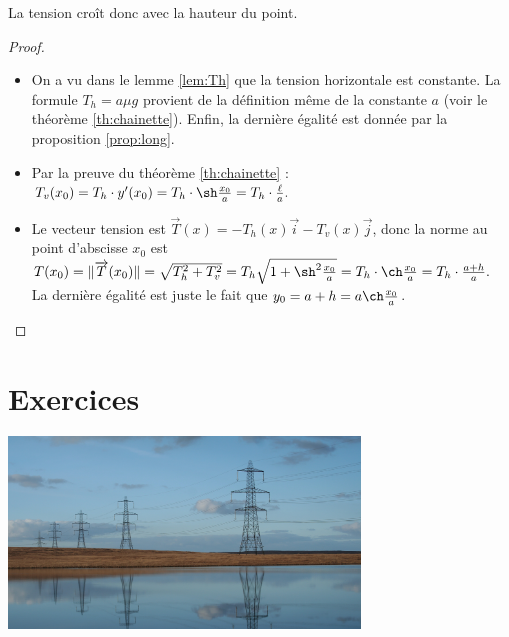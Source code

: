\documentclass[class=report,crop=false]{standalone}
\begin{document}
La tension croît donc avec la hauteur du point.


\begin{proof}
\begin{itemize}
  \item On a vu dans le lemme \ref{lem:Th} que la tension horizontale est constante. 
  La formule $T_h = a \mu g$ provient de la définition même de la constante $a$ (voir le théorème \ref{th:chainette}).
  Enfin, la dernière égalité est donnée par la proposition \ref{prop:long}.
  
  \item Par la preuve du théorème \ref{th:chainette} : $T_v(x_0) = T_h \cdot y'(x_0) =
  T_h \cdot \sh \frac{x_0}{a} = T_h \cdot \frac \ell a.$
  
  \item Le vecteur tension est $\vec T(x) = -T_h(x)\vec i - T_v(x) \vec j$,
  donc la norme au point d'abscisse $x_0$ est $T(x_0) = \|\vec T(x_0) \| 
  = \sqrt{T_h^2+T_v^2} = T_h \sqrt{1+\sh^2 \frac{x_0}{a}}
  = T_h \cdot \ch \frac{x_0}{a} = T_h \cdot \frac{a+h}{a}.$
  La dernière égalité est juste le fait que $y_0 = a+h = a \ch \frac{x_0}{a}$.
\end{itemize}
\end{proof}




\section{Exercices}

\begin{center}
   \includegraphics[width=0.7\textwidth]{figures/Pylones_by_Graham_Sivills.jpg} 
 \end{center}
\end{document}
